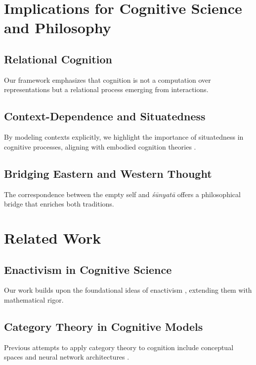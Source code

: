 \documentclass{article}
\begin{document}
\section{Implications for Cognitive Science and Philosophy}

\subsection{Relational Cognition}

Our framework emphasizes that cognition is not a computation over representations but a relational process emerging from interactions.

\subsection{Context-Dependence and Situatedness}

By modeling contexts explicitly, we highlight the importance of situatedness in cognitive processes, aligning with embodied cognition theories \cite{clark1997}.

\subsection{Bridging Eastern and Western Thought}

The correspondence between the empty self and \emph{śūnyatā} offers a philosophical bridge that enriches both traditions.

\section{Related Work}

\subsection{Enactivism in Cognitive Science}

Our work builds upon the foundational ideas of enactivism \cite{varela1991}, extending them with mathematical rigor.

\subsection{Category Theory in Cognitive Models}

Previous attempts to apply category theory to cognition include conceptual spaces \cite{gardenfors2004} and neural network architectures \cite{spivak2014}.
\end{document}
